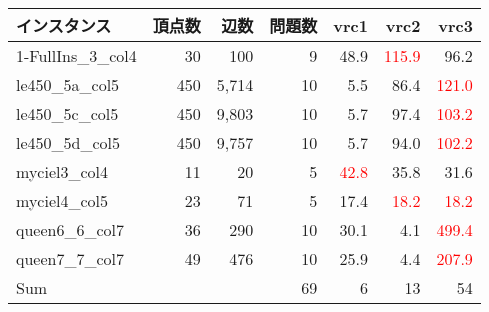 \begin{tabular}{lrrr|rrr} \hline
  インスタンス & 頂点数 & 辺数 & 問題数 & vrc1 & vrc2 & vrc3 \\ \hline
  1-FullIns\_3\_col4 & 30 & 100 & 9 & 48.9 & \textcolor{red}{115.9} & 96.2 \\   
  le450\_5a\_col5 & 450 & 5,714 & 10 & 5.5 & 86.4 & \textcolor{red}{121.0} \\ 
  le450\_5c\_col5 & 450 & 9,803 & 10 & 5.7 & 97.4 & \textcolor{red}{103.2} \\ 
  le450\_5d\_col5 & 450 & 9,757 & 10 & 5.7 & 94.0 & \textcolor{red}{102.2} \\ 
  myciel3\_col4 & 11 & 20 & 5 & \textcolor{red}{42.8} & 35.8 & 31.6 \\ 
  myciel4\_col5 & 23 & 71 & 5 & 17.4 & \textcolor{red}{18.2} & \textcolor{red}{18.2} \\ 
  queen6\_6\_col7 & 36 & 290 & 10 & 30.1 & 4.1 & \textcolor{red}{499.4} \\ 
  queen7\_7\_col7 & 49 & 476 & 10 & 25.9 & 4.4 & \textcolor{red}{207.9} \\ \hline
  Sum &  &  & 69 & 6 & 13 & 54 \\ \hline
\end{tabular}
